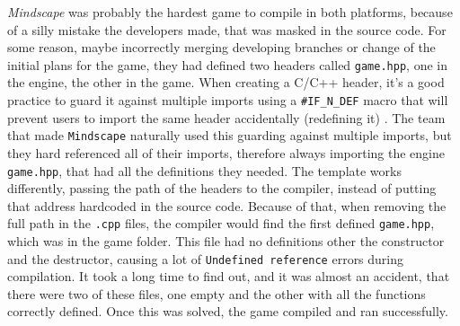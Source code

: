 \textit{Mindscape} was probably the hardest game to compile in both platforms, because of a silly mistake the developers made, that was masked in the source code. For some reason, maybe incorrectly merging developing branches or change of the initial plans for the game, they had defined two headers called \texttt{game.hpp}, one in the engine, the other in the game. When creating a C/C++ header, it's a good practice to guard it against multiple imports using a \texttt{\#IF\_N\_DEF} macro that will prevent users to import the same header accidentally (redefining it) \cite{disch_2009}. The team that made \texttt{Mindscape} naturally used this guarding against multiple imports, but they hard referenced all of their imports, therefore always importing the engine \texttt{game.hpp}, that had all the definitions they needed. The template works differently, passing the path of the headers to the compiler, instead of putting that address hardcoded in the source code. Because of that, when removing the full path in the \texttt{.cpp} files, the compiler would find the first defined \texttt{game.hpp}, which was in the game folder. This file had no definitions other the constructor and the destructor, causing a lot of \texttt{Undefined reference} errors during compilation. It took a long time to find out, and it was almost an accident, that there were two of these files, one empty and the other with all the functions correctly defined. Once this was solved, the game compiled and ran successfully.



